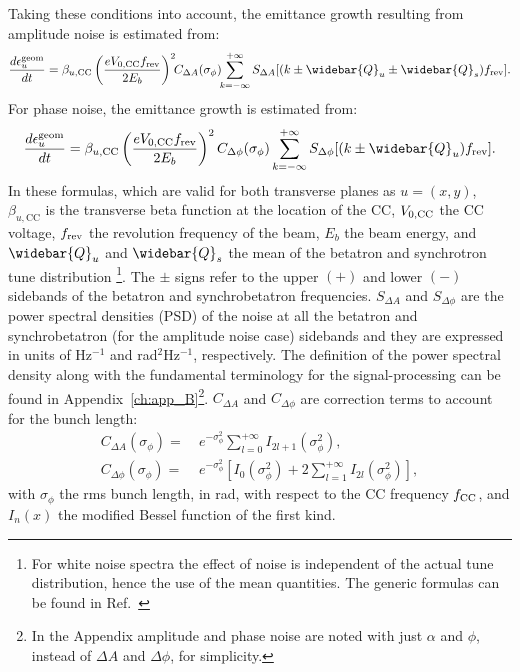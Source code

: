 Taking these conditions into account, the emittance growth resulting from amplitude noise is estimated from:
\begin{equation}\label{eq:dey_an}
    \frac{d\epsilon^{\mathrm{geom}}_u}{dt}  = \beta_{u, \mathrm{CC}} \left( \frac{e\CCvoltage\frev}{2E_b}\right)^2 \!\! C_{\Delta A} (\sigma_{\phi}) \!\! \sum_{k=-\infty}^{+\infty} S_{\Delta A}[(k \pm \widebar{Q}_u \pm \widebar{Q}_s)\frev].
\end{equation}
For phase noise, the emittance growth is estimated from:
\begin{equation}\label{eq:dey_pn}
    \frac{d\epsilon^{\mathrm{geom}}_u}{dt}  = \beta_{u, \mathrm{CC}}  \left( \frac{e\CCvoltage\frev}{2E_b}\right)^2 C_{\Delta \phi} (\sigma_{\phi}) \sum_{k=-\infty}^{+\infty} S_{\Delta \phi}[(k \pm \widebar{Q}_u) \frev].
\end{equation}
In these formulas, which are valid for both transverse planes as $u=(x,y)$, $\beta_{u, \mathrm{CC}}$ is the transverse beta function at the location of the CC, ${V_\mathrm{0, CC}}$ the CC voltage, ${f_\mathrm{rev}}$ the revolution frequency of the beam, $E_b$ the beam energy, and $\widebar{Q}_u$ and $\widebar{Q}_s$ the mean of the betatron and synchrotron tune distribution \footnote{For white noise spectra the effect of noise is independent of the actual tune distribution, hence the use of the mean quantities. The generic formulas can be found in Ref.~\cite{PhysRevSTAB.18.101001}}. %
The $\pm$ signs refer to the upper $(+)$ and lower $(-)$ sidebands of the betatron and synchrobetatron frequencies. $S_{\Delta A}$ and $S_{\Delta \phi}$ are the power spectral densities (PSD) of the noise at all the betatron and synchrobetatron (for the amplitude noise case) sidebands and they are expressed in units of Hz$^{-1}$ and rad$^2$Hz$^{-1}$, respectively. The definition of the power spectral density along with the fundamental terminology for the signal-processing can be found in Appendix~\ref{ch:app_B}\footnote{In the Appendix amplitude and phase noise are noted with just $\alpha$ and $\phi$, instead of $\Delta A$ and $\Delta \phi$, for simplicity.}.
$C_{\Delta A}$ and $C_{\Delta \phi}$ are correction terms to account for the bunch length:
\begin{align}
C_{\Delta A}(\sigma_{\phi}) = ~& e^{-\sigma_{\phi}^2}\sum_{l=0}^{+\infty} I_{2l+1}(\sigma_{\phi}^2),\\
C_{\Delta \phi}(\sigma_{\phi}) = ~& e^{-\sigma_{\phi}^2} \left[I_0(\sigma_{\phi}^2) + 2 \sum_{l=1}^{+\infty} I_{2l}(\sigma_{\phi}^2) \right],
\end{align}
with $\sigma_{\phi}$ the rms bunch length, in rad, with respect to the CC frequency ${f_\mathrm{CC}}$, and $I_n(x)$ the modified Bessel function of the first kind. 

